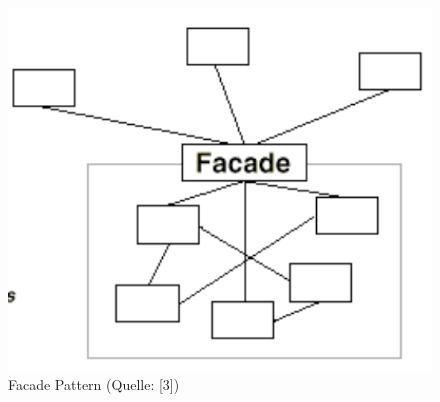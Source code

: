 \begin{figure}[ht]
\centering
\includegraphics[scale=0.5]{../figures/facade_pattern}
\caption{Facade Pattern (Quelle: [3])}
\end{figure}
